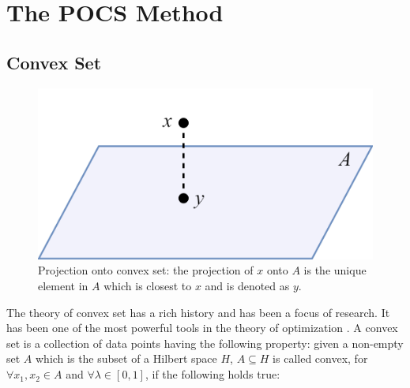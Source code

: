 \documentclass[conference]{IEEEtran}
\begin{document}



\section{The POCS Method}

\subsection{Convex Set}

\begin{figure}[t]
\centering
\includegraphics[width=0.7\columnwidth]{figures/fig1_v4.png}
\caption{Projection onto convex set: the projection of $x$ onto $A$ is the unique element in $A$ which is closest to $x$ and is denoted as $y$.}
\end{figure}

The theory of convex set has a rich history and has been a focus of research. It has been one of the most powerful tools in the theory of optimization \cite{b1}. A convex set is a collection of data points having the following property: given a non-empty set $A$ which is the subset of a Hilbert space $H$, $ A \subseteq H $ is called convex, for  $ \forall x_1, x_2 \in A $ and $\forall \lambda \in [0, 1]$, if the following holds true:
\end{document}
